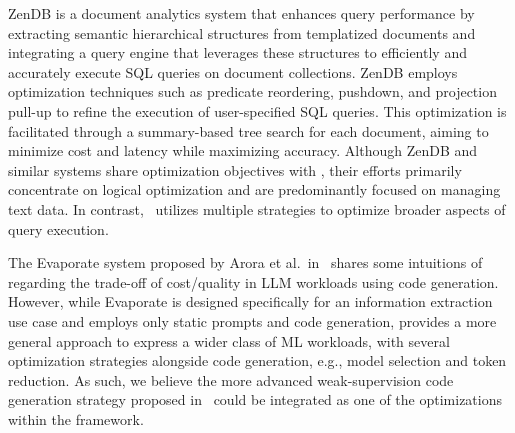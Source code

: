 ZenDB \cite{lin2024towards} is a document analytics system that enhances query performance by extracting semantic hierarchical structures from templatized documents and integrating a query engine that leverages these structures to efficiently and accurately execute SQL queries on document collections. ZenDB employs optimization techniques such as predicate reordering, pushdown, and projection pull-up to refine the execution of user-specified SQL queries. This optimization is facilitated through a summary-based tree search for each document, aiming to minimize cost and latency while maximizing accuracy. Although ZenDB and similar systems share optimization objectives with \system, their efforts primarily concentrate on logical optimization and are predominantly focused on managing text data. In contrast, \system\ utilizes multiple strategies to optimize broader aspects of query execution.

The Evaporate system proposed by Arora et al.\ in~\cite{arora2023language} shares some intuitions of \system{} regarding the trade-off of cost/quality in LLM workloads using code generation.
However, while Evaporate is designed specifically for an information extraction use case and employs only static prompts and code generation, \system{} provides a more general approach to express a wider class of ML workloads, with several optimization strategies alongside code generation, e.g., model selection and token reduction.
As such, we believe the more advanced weak-supervision code generation strategy proposed in~\cite{arora2023language} could be integrated as one of the optimizations within the \system{} framework.  






